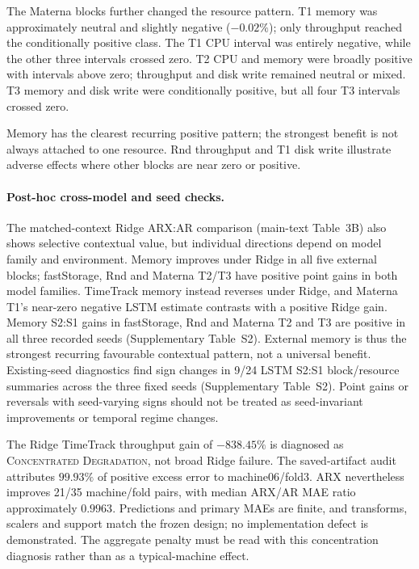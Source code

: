 \documentclass[a4paper,11pt]{article}
\begin{document}
The Materna blocks further changed the resource pattern. T1 memory was
approximately neutral and slightly negative ($-0.02\%$); only throughput
reached the conditionally positive class. The T1 CPU interval was entirely
negative, while the other three intervals crossed zero. T2 CPU and memory
were broadly positive with intervals above zero; throughput and disk write
remained neutral or mixed. T3 memory and disk write were conditionally
positive, but all four T3 intervals crossed zero.

Memory has the clearest recurring positive pattern; the strongest benefit is
not always attached to one resource. Rnd throughput and T1 disk write illustrate
adverse effects where other blocks are near zero or positive.

\paragraph{Post-hoc cross-model and seed checks.}
The matched-context Ridge ARX:AR comparison
(main-text Table~3B) also shows selective contextual value,
but individual directions depend on model family and environment. Memory
improves under Ridge in all five external blocks; fastStorage, Rnd and
Materna T2/T3 have positive point gains in both model families. TimeTrack
memory instead reverses under Ridge, and Materna T1's near-zero negative
LSTM estimate contrasts with a positive Ridge gain. Memory S2:S1 gains in
fastStorage, Rnd and Materna T2 and T3 are positive in all three recorded
seeds (Supplementary Table~S2). External memory is thus
the strongest recurring favourable contextual pattern, not a universal
benefit. Existing-seed diagnostics find sign changes in 9/24 LSTM S2:S1
block/resource summaries across the three fixed seeds (Supplementary
Table~S2). Point gains or reversals with seed-varying signs should not be
treated as seed-invariant improvements or temporal regime changes.

The Ridge TimeTrack throughput gain of $-838.45\%$ is diagnosed as
\textsc{Concentrated Degradation}, not broad Ridge failure. The saved-artifact
audit attributes $99.93\%$ of positive excess error to machine06/fold3.
ARX nevertheless improves 21/35 machine/fold pairs, with median ARX/AR MAE
ratio approximately $0.9963$. Predictions and primary MAEs are finite, and
transforms, scalers and support match the frozen design; no implementation
defect is demonstrated. The aggregate penalty must be read with this
concentration diagnosis rather than as a typical-machine effect.
\end{document}
